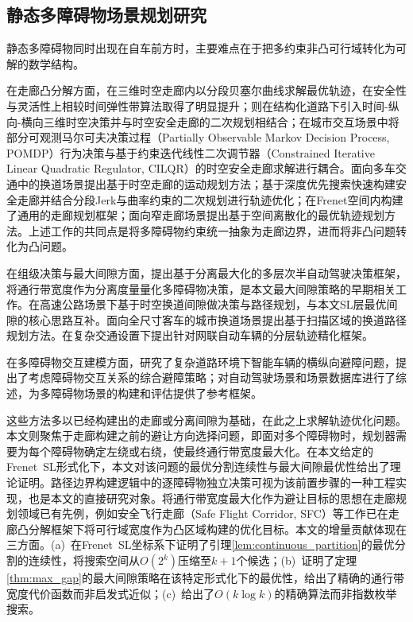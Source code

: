 \subsection{静态多障碍物场景规划研究}

静态多障碍物同时出现在自车前方时，主要难点在于把多约束非凸可行域转化为可解的数学结构。

在走廊凸分解方面，\citet{yang2025stcorridor}在三维时空走廊内以分段贝塞尔曲线求解最优轨迹，在安全性与灵活性上相较时间弹性带算法取得了明显提升；\citet{qiao2025stjoint}则在结构化道路下引入时间-纵向-横向三维时空决策并与时空安全走廊的二次规划相结合；\citet{xu2025interaction}在城市交互场景中将部分可观测马尔可夫决策过程（Partially Observable Markov Decision Process, POMDP）行为决策与基于约束迭代线性二次调节器（Constrained Iterative Linear Quadratic Regulator, CILQR）的时空安全走廊求解进行耦合。\citet{yoon2024stcorridor}面向多车交通中的换道场景提出基于时空走廊的运动规划方法；\citet{lijun2024corridor}基于深度优先搜索快速构建安全走廊并结合分段Jerk与曲率约束的二次规划进行轨迹优化；\citet{frenetcorridor2025}在Frenet空间内构建了通用的走廊规划框架；\citet{narrowcorridor2022}面向窄走廊场景提出基于空间离散化的最优轨迹规划方法。上述工作的共同点是将多障碍物约束统一抽象为走廊边界，进而将非凸问题转化为凸问题。

在组级决策与最大间隙方面，\citet{separationmax2013}提出基于分离最大化的多层次半自动驾驶决策框架，将通行带宽度作为分离度量量化多障碍物决策，是本文最大间隙策略的早期相关工作。\citet{stchangegaps2022}在高速公路场景下基于时空换道间隙做决策与路径规划，与本文SL层最优间隙的核心思路互补。\citet{sweepingregion2025}面向全尺寸客车的城市换道场景提出基于扫描区域的换道路径规划方法。\citet{zhaofuzhou2024}在复杂交通设置下提出针对网联自动车辆的分层轨迹精化框架。

在多障碍物交互建模方面，\citet{chen2024avoid}研究了复杂道路环境下智能车辆的横纵向避障问题，提出了考虑障碍物交互关系的综合避障策略；\citet{guo2024survey}对自动驾驶场景和场景数据库进行了综述，为多障碍物场景的构建和评估提供了参考框架。

这些方法多以已经构建出的走廊或分离间隙为基础，在此之上求解轨迹优化问题。本文则聚焦于走廊构建之前的避让方向选择问题，即面对多个障碍物时，规划器需要为每个障碍物确定左绕或右绕，使最终通行带宽度最大化。在本文给定的Frenet~SL形式化下，本文对该问题的最优分割连续性与最大间隙最优性给出了理论证明。路径边界构建逻辑中的逐障碍物独立决策可视为该前置步骤的一种工程实现，也是本文的直接研究对象。将通行带宽度最大化作为避让目标的思想在走廊规划领域已有先例，例如安全飞行走廊（Safe Flight Corridor, SFC）\cite{liu2017sfc}等工作已在走廊凸分解框架下将可行域宽度作为凸区域构建的优化目标。本文的增量贡献体现在三方面。(a)~在Frenet~SL坐标系下证明了引理\ref{lem:continuous_partition}的最优分割的连续性，将搜索空间从$O(2^k)$压缩至$k+1$个候选；(b)~证明了定理\ref{thm:max_gap}的最大间隙策略在该特定形式化下的最优性，给出了精确的通行带宽度代价函数而非启发式近似；(c)~给出了$O(k \log k)$的精确算法而非指数枚举搜索。

